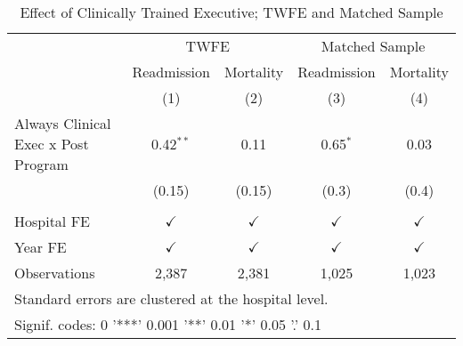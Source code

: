 \begin{table}[ht!]

\caption{\label{tab:main_twfe_match}Effect of Clinically Trained Executive; TWFE and Matched Sample}
\centering
\begin{tabular}[t]{lcccc}
\toprule
\multicolumn{1}{c}{} & \multicolumn{2}{c}{TWFE} & \multicolumn{2}{c}{Matched Sample} \\
\cmidrule(l{3pt}r{3pt}){2-3} \cmidrule(l{3pt}r{3pt}){4-5}
\addlinespace[0.3em]
\multicolumn{1}{c}{ } & \multicolumn{1}{c}{Readmission} & \multicolumn{1}{c}{Mortality} & \multicolumn{1}{c}{Readmission} & \multicolumn{1}{c}{Mortality} \\
\cmidrule(l{3pt}r{3pt}){2-2} \cmidrule(l{3pt}r{3pt}){3-3} \cmidrule(l{3pt}r{3pt}){4-4} \cmidrule(l{3pt}r{3pt}){5-5}
 & (1) & (2) & (3) & (4)\\
\midrule
Always Clinical Exec x Post Program & 0.42$^{**}$ & 0.11 & 0.65$^{*}$ & 0.03\\
 & (0.15) & (0.15) & (0.3) & (0.4)\\
 &  &  &  & \\
Hospital FE & $\checkmark$ & $\checkmark$ & $\checkmark$ & $\checkmark$\\
Year FE & $\checkmark$ & $\checkmark$ & $\checkmark$ & $\checkmark$\\
\addlinespace
Observations & 2,387 & 2,381 & 1,025 & 1,023\\
\bottomrule
\multicolumn{5}{l}{\textsuperscript{} Standard errors are clustered at the hospital level.}\\
\multicolumn{5}{l}{\textsuperscript{} Signif. codes: 0 '***' 0.001 '**' 0.01 '*' 0.05 '.' 0.1}\\
\end{tabular}
\end{table}
